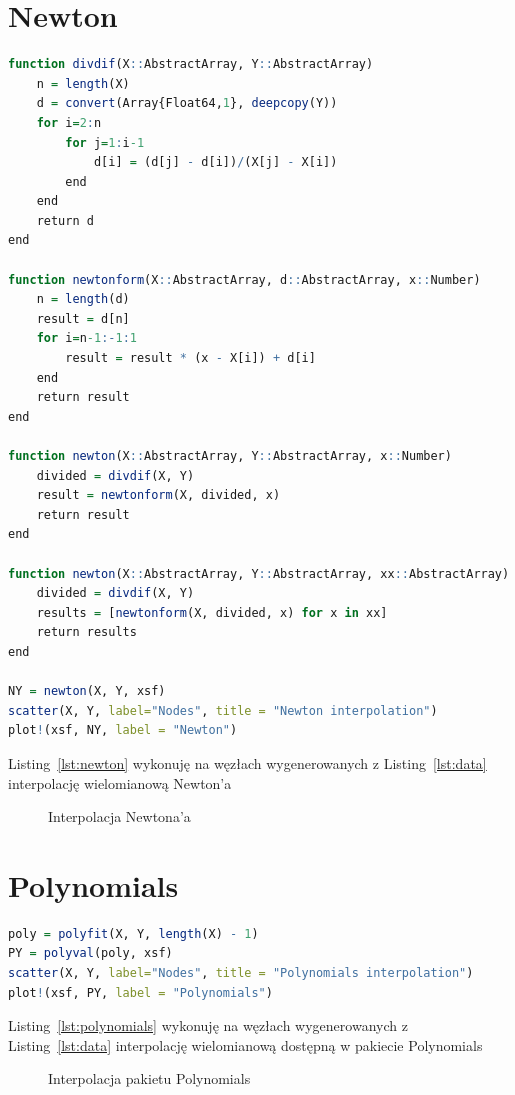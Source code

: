 \documentclass[12pt, a4paper]{article}
\begin{document}
\section{Newton}
\begin{lstlisting}[caption={Interpolacja Newton'a},language=R,label={lst:newton}]
function divdif(X::AbstractArray, Y::AbstractArray)
	n = length(X)
	d = convert(Array{Float64,1}, deepcopy(Y))
	for i=2:n
		for j=1:i-1
			d[i] = (d[j] - d[i])/(X[j] - X[i])
		end
	end
	return d
end

function newtonform(X::AbstractArray, d::AbstractArray, x::Number) 
	n = length(d)
	result = d[n]
	for i=n-1:-1:1
		result = result * (x - X[i]) + d[i]
	end
	return result
end

function newton(X::AbstractArray, Y::AbstractArray, x::Number)
	divided = divdif(X, Y)
	result = newtonform(X, divided, x)
	return result
end

function newton(X::AbstractArray, Y::AbstractArray, xx::AbstractArray)
	divided = divdif(X, Y)
	results = [newtonform(X, divided, x) for x in xx]
	return results
end

NY = newton(X, Y, xsf)
scatter(X, Y, label="Nodes", title = "Newton interpolation")
plot!(xsf, NY, label = "Newton")
\end{lstlisting}
Listing~\ref{lst:newton} wykonuję na węzłach wygenerowanych z Listing~\ref{lst:data} interpolację wielomianową Newton'a
\begin{figure}[ht!]
	\centering    
	\def\svgwidth{\columnwidth}
	
	\caption{Interpolacja Newtona'a}
	\label{fig:newton}
\end{figure}
\clearpage
\section{Polynomials}
\begin{lstlisting}[caption={Interpolacja pakietu Polynomials},language=R,label={lst:polynomials}]
poly = polyfit(X, Y, length(X) - 1)
PY = polyval(poly, xsf)
scatter(X, Y, label="Nodes", title = "Polynomials interpolation")
plot!(xsf, PY, label = "Polynomials")
\end{lstlisting}
Listing~\ref{lst:polynomials} wykonuję na węzłach wygenerowanych z Listing~\ref{lst:data} interpolację wielomianową dostępną w pakiecie Polynomials
\begin{figure}[ht!]
	\centering    
	\def\svgwidth{\columnwidth}
	
	\caption{Interpolacja pakietu Polynomials}
	\label{fig:olynomials}
\end{figure}
\clearpage
\end{document}
